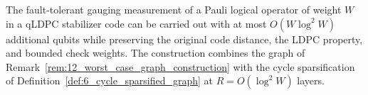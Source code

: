 \begin{corollary}
\label{cor:1_worst_case_overhead}
\leanok
The fault-tolerant gauging measurement of a Pauli logical operator of weight $W$ in a qLDPC
stabilizer code can be carried out with at most $O(W \log^2 W)$ additional qubits while
preserving the original code distance, the LDPC property, and bounded check weights. The
construction combines the graph of Remark~\ref{rem:12_worst_case_graph_construction} with
the cycle sparsification of Definition~\ref{def:6_cycle_sparsified_graph} at
$R = O(\log^2 W)$ layers.
\end{corollary}


